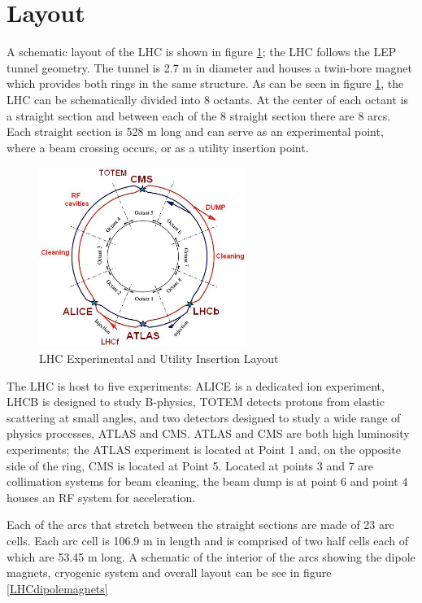 \section{Layout}
A schematic layout of the LHC is shown in figure \ref{fig:LHCring};
the LHC follows the LEP tunnel geometry.
The tunnel is 2.7 m in diameter and houses a twin-bore magnet 
which provides both rings in the same structure.
As can be seen in figure \ref{fig:LHCring},
the LHC can be schematically divided 
into 8 octants. At the center of each octant is a straight section and between
each of the 8 straight section there are 8 arcs. Each straight section
is 528 m long and can serve as an experimental point, where a beam
crossing occurs, or as a utility insertion point.
\begin{figure}[t]
  \centering
	\includegraphics[width=0.6\textwidth]{images/LHCring.jpg}
  	\caption[LHCring]
   	{LHC Experimental and Utility Insertion Layout}
	\label{fig:LHCring}
\end{figure}
The LHC is host to five experiments: ALICE is a dedicated ion
experiment, LHCB is designed to study B-physics,
TOTEM detects protons from elastic scattering at small angles,
and two detectors designed to study a wide range of 
physics processes, ATLAS and CMS.
ATLAS and CMS are both high luminosity experiments;
the ATLAS experiment is located at Point 1 and, on the opposite side
of the ring, CMS is located at Point 5. 
Located at points 3 and 7 are collimation systems for beam cleaning,
the beam dump is at point 6 and point 4 houses an RF system for acceleration.

Each of the arcs that stretch between the straight sections
are made of 23 arc cells. Each arc cell is 106.9 m in length
and is comprised of two half cells each of which are 53.45 m long.
A schematic of the interior of the arcs showing the dipole magnets,
cryogenic system and overall layout can be see in figure \ref{LHCdipolemagnets}

